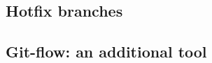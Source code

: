 \documentclass[usenames,svgnames,14pt]{beamer}
\begin{document}
\subsection{Hotfix branches}
\begin{frame}{}

\end{frame}
\subsection{Git-flow: an additional tool}
\begin{frame}{}

\end{frame}



\end{document}
